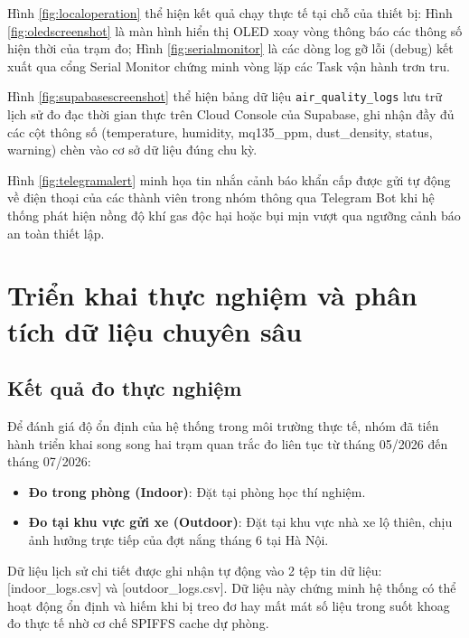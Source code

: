 Hình \ref{fig:localoperation} thể hiện kết quả chạy thực tế tại chỗ của thiết bị: Hình \ref{fig:oledscreenshot} là màn hình hiển thị OLED xoay vòng thông báo các thông số hiện thời của trạm đo; Hình \ref{fig:serialmonitor} là các dòng log gỡ lỗi (debug) kết xuất qua cổng Serial Monitor chứng minh vòng lặp các Task vận hành trơn tru.

Hình \ref{fig:supabasescreenshot} thể hiện bảng dữ liệu \texttt{air\_quality\_logs} lưu trữ lịch sử đo đạc thời gian thực trên Cloud Console của Supabase, ghi nhận đầy đủ các cột thông số (temperature, humidity, mq135\_ppm, dust\_density, status, warning) chèn vào cơ sở dữ liệu đúng chu kỳ.

Hình \ref{fig:telegramalert} minh họa tin nhắn cảnh báo khẩn cấp được gửi tự động về điện thoại của các thành viên trong nhóm thông qua Telegram Bot khi hệ thống phát hiện nồng độ khí gas độc hại hoặc bụi mịn vượt qua ngưỡng cảnh báo an toàn thiết lập.

\section{Triển khai thực nghiệm và phân tích dữ liệu chuyên sâu}
\subsection{Kết quả đo thực nghiệm}
Để đánh giá độ ổn định của hệ thống trong môi trường thực tế, nhóm đã tiến hành triển khai song song hai trạm quan trắc đo liên tục từ tháng 05/2026 đến tháng 07/2026:
\begin{itemize}
    \item \textbf{Đo trong phòng (Indoor)}: Đặt tại phòng học thí nghiệm.
    \item \textbf{Đo tại khu vực gửi xe (Outdoor)}: Đặt tại khu vực nhà xe lộ thiên, chịu ảnh hưởng trực tiếp của đợt nắng tháng 6 tại Hà Nội.
\end{itemize}

Dữ liệu lịch sử chi tiết được ghi nhận tự động vào 2 tệp tin dữ liệu: [indoor\_logs.csv] và [outdoor\_logs.csv]. Dữ liệu này chứng minh hệ thống có thể hoạt động ổn định và hiếm khi bị treo đơ hay mất mát số liệu trong suốt khoag đo thực tế nhờ cơ chế SPIFFS cache dự phòng.

